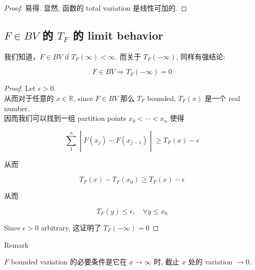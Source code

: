 \documentclass{qlnotes-export}
\begin{document}
\begin{proof}

易得. 显然, 函数的 total variation 是线性可加的.

\end{proof}

\subsection{\texorpdfstring{\(F \in BV\) 的 \(T_{F}\) 的 limit behavior}{F \textbackslash in BV 的 T\_\{F\} 的 limit behavior}}\label{f-in-bv-ux7684-t_f-ux7684-limit-behavior}

我们知道，\(F \in BV\) if \(T_{F}(\infty) < \infty\). 而关于 \(T_{F}( - \infty)\), 同样有强结论:

\begin{proposition}\label{prop-12-differentiation-on-real-spaces-proposition-002}

\[F \in BV\Longrightarrow T_{F}( - \infty) = 0\]

\end{proposition}

\begin{proof}

Let \(\epsilon > 0\).\\
从而对于任意的 \(x \in {\mathbb{R}}\), since \(F \in BV\) 那么 \(T_{F}\) bounded, \(T_{F}(x)\) 是一个 real number.\\
因而我们可以找到一组 partition points \(x_{0} < \cdots < x_{n}\) 使得

\[\left. \sum\limits_{1}^{n} \middle| F(x_{j}) - F(x_{j - 1}) \middle| \geq T_{F}(x) - \epsilon \right.\]

从而

\[T_{F}(x) - T_{F}(x_{0}) \geq T_{F}(x) - \epsilon\]

从而

\[T_{F}(y) \leq \epsilon,\quad\forall y \leq x_{0}\]

Since \(\epsilon > 0\) arbitrary, 这证明了 \(T_{F}( - \infty) = 0\)

\end{proof}

\begin{qlremark}{Remark}

\(F\) bounded variation 的必要条件是它在 \(x\rightarrow\infty\) 时, 截止 \(x\) 处的 variation \(\rightarrow 0\).

\end{qlremark}
\end{document}

